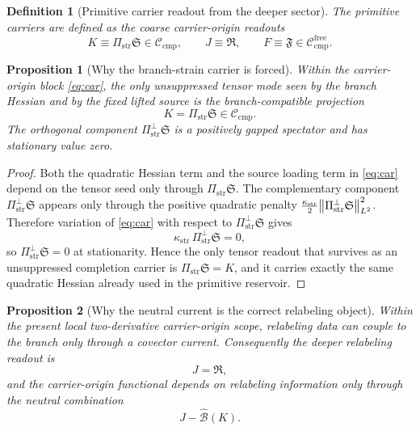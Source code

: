 \documentclass[11pt]{article}
\newcommand{\SubGaugeVec}{\widehat{\mathcal B}}
\newcommand{\CompClass}{\mathscr C_{\mathrm{cmp}}}
\newcommand{\CompFree}{\mathscr C_{\mathrm{cmp}}^{\mathrm{free}}}
\newcommand{\PrimStrain}{K}
\newcommand{\PrimNeutral}{J}
\newcommand{\PrimFree}{F}
\newcommand{\CarrierProj}{\Pi_{\mathrm{str}}}
\newcommand{\CarrierPerp}{\Pi_{\mathrm{str}}^{\perp}}
\newcommand{\CarrierGap}{\kappa_{\mathrm{str}}}
\newcommand{\CarrierSeed}{\mathfrak S}
\newcommand{\RelabelSeed}{\mathfrak R}
\newcommand{\FreeSeed}{\mathfrak F}
\newtheorem{definition}{Definition}
\newtheorem{proposition}{Proposition}
\begin{document}
\begin{definition}[Primitive carrier readout from the deeper sector]
\label{def:readout}
The primitive carriers are defined as the coarse carrier-origin readouts
\begin{equation}
\PrimStrain\equiv \CarrierProj\CarrierSeed\in\CompClass,
\qquad
\PrimNeutral\equiv \RelabelSeed,
\qquad
\PrimFree\equiv \FreeSeed\in\CompFree.
\label{eq:readout}
\end{equation}
\end{definition}

\begin{proposition}[Why the branch-strain carrier is forced]
\label{prop:strain}
Within the carrier-origin block \eqref{eq:car}, the only unsuppressed tensor mode seen by the branch Hessian and by the fixed lifted source is the branch-compatible projection
\[
\PrimStrain=\CarrierProj\CarrierSeed\in\CompClass.
\]
The orthogonal component \(\CarrierPerp\CarrierSeed\) is a positively gapped spectator and has stationary value zero.
\end{proposition}

\begin{proof}
Both the quadratic Hessian term and the source loading term in \eqref{eq:car} depend on the tensor seed only through \(\CarrierProj\CarrierSeed\). The complementary component \(\CarrierPerp\CarrierSeed\) appears only through the positive quadratic penalty \(\frac{\CarrierGap}{2}\norm{\CarrierPerp\CarrierSeed}_{L^2}^2\). Therefore variation of \eqref{eq:car} with respect to \(\CarrierPerp\CarrierSeed\) gives
\[
\CarrierGap\,\CarrierPerp\CarrierSeed=0,
\]
so \(\CarrierPerp\CarrierSeed=0\) at stationarity. Hence the only tensor readout that survives as an unsuppressed completion carrier is \(\CarrierProj\CarrierSeed=\PrimStrain\), and it carries exactly the same quadratic Hessian already used in the primitive reservoir.
\end{proof}

\begin{proposition}[Why the neutral current is the correct relabeling object]
\label{prop:neutral}
Within the present local two-derivative carrier-origin scope, relabeling data can couple to the branch only through a covector current. Consequently the deeper relabeling readout is
\[
\PrimNeutral=\RelabelSeed,
\]
and the carrier-origin functional depends on relabeling information only through the neutral combination
\[
\PrimNeutral-\SubGaugeVec(\PrimStrain).
\]
\end{proposition}
\end{document}
